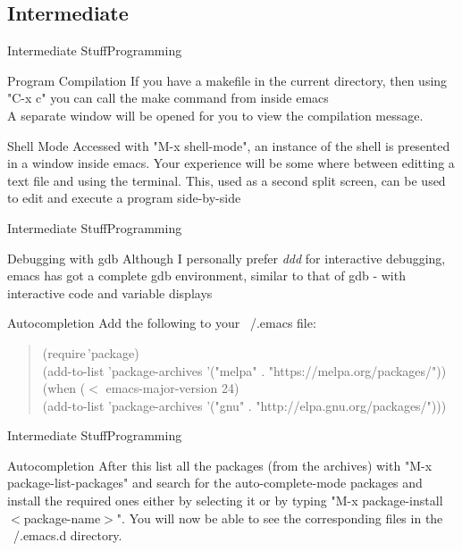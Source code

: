 \documentclass{beamer}
\begin{document}
\subsection{Intermediate}
\begin{frame}{Intermediate Stuff}{Programming}
\begin{block}{Program Compilation}
If you have a makefile in the current directory, then using "C-x c" you can call the make command from inside emacs\\
A separate window will be opened for you to view the compilation message.
\end{block}
\begin{block}{Shell Mode}
Accessed with "M-x shell-mode", an instance of the shell is presented in a window inside emacs. Your experience will be some where between editting a text file and using the terminal. This, used as a second split screen, can be used to edit and execute a program side-by-side
\end{block}
\end{frame}

\begin{frame}{Intermediate Stuff}{Programming}
\begin{block}{Debugging with gdb}
Although I personally prefer \emph{ddd} for interactive debugging, emacs has got a complete gdb environment, similar to that of gdb - with interactive code and variable displays
\end{block}
\begin{block}{Autocompletion}
Add the following to your ~/.emacs file:
\begin{quote}
(require\,'package)\\
(add-to-list 'package-archives '("melpa" . "https://melpa.org/packages/"))\\
(when ($<$ emacs-major-version 24)\\
(add-to-list 'package-archives '("gnu" . "http://elpa.gnu.org/packages/")))
\end{quote}
\end{block}
\end{frame}

\begin{frame}{Intermediate Stuff}{Programming}
\begin{block}{Autocompletion}
After this list all the packages (from the archives) with "M-x package-list-packages" and search for the auto-complete-mode packages and install the required ones either by selecting it or by typing "M-x package-install $<$package-name$>$". You will now be able to see the corresponding files in the ~/.emacs.d directory.
\end{block}
\end{frame}
\end{document}
